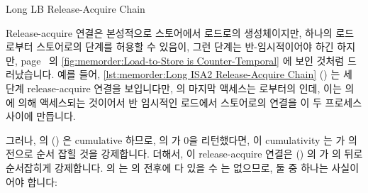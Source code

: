 \begin{listing}[tbp]

\caption{Long LB Release-Acquire Chain}
\label{lst:memorder:Long LB Release-Acquire Chain}
\end{listing}

Release-acquire 연결은 본성적으로 스토어에서 로드로의 생성체이지만, 하나의
로드로부터 스토어로의 단계를 허용할 수 있음이, 그런 단계는 반-임시적이어야 하긴
하지만,
page~\pageref{fig:memorder:Load-to-Store is Counter-Temporal} 의
\cref{fig:memorder:Load-to-Store is Counter-Temporal}
에 보인 것처럼 드러났습니다.
예를 들어,
\cref{lst:memorder:Long ISA2 Release-Acquire Chain}
()
는 세 단계 release-acquire 연결을 보입니다만,  의 마지막 액세스는
 로부터의  인데, 이는  의  에
의해 액세스되는 것이어서 반 임시적인 로드에서 스토어로의 연결을 이 두 프로세스
사이에 만듭니다.
\begin{fcvref}
그러나,  의  () 은 cumulative
하므로,  의  가 0을 리턴했다면, 이 cumulativity 는
 가  의  전으로 순서 잡힐 것을
강제합니다.
더해서, 이 release-acquire 연결은
()
 의  가  의  뒤로
순서잡히게 강제합니다.
 의  는  의  전후에
다 있을 수 는 없으므로, 둘 중 하나는 사실이어야 합니다:
\end{fcvref}

\iffalse

